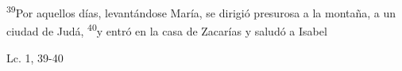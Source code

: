 \documentclass[../../rosario.tex]{subfiles}
\begin{document}
    \textsuperscript{39}Por aquellos días, levantándose María, se dirigió presurosa a la montaña, a un ciudad de Judá, \textsuperscript{40}y entró en la casa
    de Zacarías y saludó a Isabel
    \begin{flushright}
    Lc. 1, 39-40        
    \end{flushright}
\end{document}
